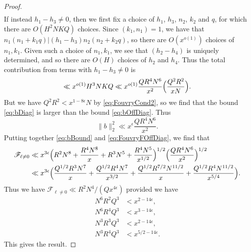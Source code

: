 \documentclass[10pt]{amsart}
\theoremstyle{plain}
\numberwithin{equation}{section}
\begin{document}
\begin{proof}
\begin{align}
\label{eq:bDiag}
\end{align}
If instead $h_1-h_3\ne 0$, then we first fix a choice of $h_1$, $h_3$, $n_2$, $k_2$ and $q$, for which there are $O(H^2 N K Q)$ choices. Since $(k_1,n_1)=1$, we have that $n_1(n_1+k_1q)|(h_1-h_3)n_2(n_2+k_2q)$, so there are $O(x^{o(1)})$ choices of $n_1,k_1$. Given such a choice of $n_1,k_1$, we see that $(h_2-h_4)$ is uniquely determined, and so there are $O(H)$ choices of $h_2$ and $h_4$. Thus the total contribution from terms with $h_1-h_3\ne 0$ is 
\begin{equation}
\ll x^{o(1)}H^3 N K Q\ll x^{o(1)} \frac{Q R^4N^6}{x^2}\Bigl(\frac{Q^2R^2}{x N}\Bigr).
\label{eq:bOffDiag}
\end{equation}
But we have $Q^2 R^2<x^{1-8\epsilon}N$ by \eqref{eq:FouvryCond2}, so we find that the bound \eqref{eq:bDiag} is larger than the bound \eqref{eq:bOffDiag}. Thus
\begin{equation}
\|b\|_2^2\ll x^{\epsilon}\frac{Q R^4 N^6}{x^2}.\label{eq:bBound}
\end{equation}
Putting together \eqref{eq:bBound} and \eqref{eq:FouvryFOffDiag}, we find that
\begin{align*}
\mathscr{F}_{\ell\ne 0}&\ll x^{3\epsilon}\Bigl(R^2 N^8+\frac{R^4 N^8}{x}+R^3 N^5+\frac{R^4 N^5}{x^{1/2}}\Bigr)^{1/2}\Bigl(\frac{Q R^4 N^6}{x^2}\Bigr)^{1/2}\\
&\ll x^{3\epsilon}\Bigl(\frac{Q^{1/2} R^3 N^7}{x}+\frac{Q^{1/2} R^4 N^7}{x^{3/2}}+\frac{Q^{1/2}R^{7/2}N^{11/2}}{x}+\frac{Q^{1/2}R^4 N^{11/2}}{x^{5/4}}\Bigr).
\end{align*}
Thus we have $\mathscr{F}_{\ell\ne 0}\ll R^2 N^4/(Q x^{4\epsilon})$ provided we have
\begin{align}
N^6 R^2 Q^{3}&<x^{2-14\epsilon},\\
N^6 R^4 Q^{3}&<x^{3-14\epsilon},\\
N^{3}R^{3}Q^{3}&<x^{2-14\epsilon},\\
N^{3}R^{4}Q^{3}&<x^{5/2-14\epsilon}.
\end{align}
This gives the result.
\end{proof}
%
%
%
%
%
%
%
%
\end{document}
